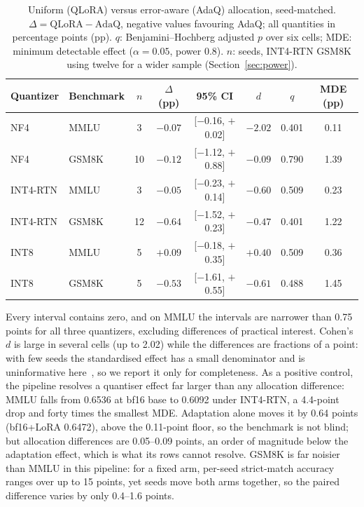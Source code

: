 \documentclass[preprint,12pt]{elsarticle}
\begin{document}
\begin{table}[t]
\centering
\caption{Uniform (QLoRA) versus error-aware (AdaQ) allocation, seed-matched. $\Delta = \mathrm{QLoRA}-\mathrm{AdaQ}$, negative values favouring AdaQ; all quantities in percentage points (pp). $q$: Benjamini--Hochberg adjusted $p$ over six cells; MDE: minimum detectable effect ($\alpha=0.05$, power $0.8$). $n$: seeds, INT4-RTN GSM8K using twelve for a wider sample (Section~\ref{sec:power}).}
\label{tab:main_results}
\footnotesize
\setlength{\tabcolsep}{4.5pt}
\begin{tabular}{llcccccc}
\toprule
\textbf{Quantizer} & \textbf{Benchmark} & \textbf{$n$} & \textbf{$\Delta$ (pp)} & \textbf{95\% CI} & \textbf{$d$} & \textbf{$q$} & \textbf{MDE (pp)} \\
\midrule
NF4      & MMLU  & 3 & $-0.07$ & [$-$0.16, $+$0.02] & $-2.02$ & 0.401 & 0.11 \\
NF4      & GSM8K & 10 & $-0.12$ & [$-$1.12, $+$0.88] & $-0.09$ & 0.790 & 1.39 \\
INT4-RTN & MMLU  & 3 & $-0.05$ & [$-$0.23, $+$0.14] & $-0.60$ & 0.509 & 0.23 \\
INT4-RTN & GSM8K & 12 & $-0.64$ & [$-$1.52, $+$0.23] & $-0.47$ & 0.401 & 1.22 \\
INT8     & MMLU  & 5 & $+0.09$ & [$-$0.18, $+$0.35] & $+0.40$ & 0.509 & 0.36 \\
INT8     & GSM8K & 5 & $-0.53$ & [$-$1.61, $+$0.55] & $-0.61$ & 0.488 & 1.45 \\
\bottomrule
\end{tabular}
\end{table}

Every interval contains zero, and on MMLU the intervals are narrower than 0.75 points for all three quantizers, excluding differences of practical interest.  Cohen's $d$ is large in several cells (up to 2.02) while the differences are fractions of a point: with few seeds the standardised effect has a small denominator and is uninformative here~\citep{cohen1988}, so we report it only for completeness. As a positive control, the pipeline resolves a quantiser effect far larger than any allocation difference: MMLU falls from 0.6536 at bf16 base to 0.6092 under INT4-RTN, a 4.4-point drop and forty times the smallest MDE. Adaptation alone moves it by 0.64 points (bf16+LoRA 0.6472), above the 0.11-point floor, so the benchmark is not blind; but allocation differences are 0.05--0.09 points, an order of magnitude below the adaptation effect, which is what its rows cannot resolve. GSM8K is far noisier than MMLU in this pipeline: for a fixed arm, per-seed strict-match accuracy ranges over up to 15 points, yet seeds move both arms together, so the paired difference varies by only 0.4--1.6 points.
\end{document}
